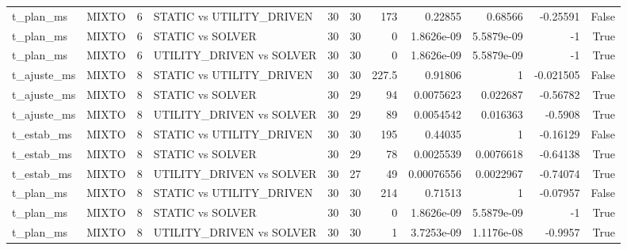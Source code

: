 \begin{tabular}{llrlrrrrrrr}
t_plan_ms & MIXTO & 6 & STATIC vs UTILITY_DRIVEN & 30 & 30 & 173 & 0.22855 & 0.68566 & -0.25591 & False \\
t_plan_ms & MIXTO & 6 & STATIC vs SOLVER & 30 & 30 & 0 & 1.8626e-09 & 5.5879e-09 & -1 & True \\
t_plan_ms & MIXTO & 6 & UTILITY_DRIVEN vs SOLVER & 30 & 30 & 0 & 1.8626e-09 & 5.5879e-09 & -1 & True \\
t_ajuste_ms & MIXTO & 8 & STATIC vs UTILITY_DRIVEN & 30 & 30 & 227.5 & 0.91806 & 1 & -0.021505 & False \\
t_ajuste_ms & MIXTO & 8 & STATIC vs SOLVER & 30 & 29 & 94 & 0.0075623 & 0.022687 & -0.56782 & True \\
t_ajuste_ms & MIXTO & 8 & UTILITY_DRIVEN vs SOLVER & 30 & 29 & 89 & 0.0054542 & 0.016363 & -0.5908 & True \\
t_estab_ms & MIXTO & 8 & STATIC vs UTILITY_DRIVEN & 30 & 30 & 195 & 0.44035 & 1 & -0.16129 & False \\
t_estab_ms & MIXTO & 8 & STATIC vs SOLVER & 30 & 29 & 78 & 0.0025539 & 0.0076618 & -0.64138 & True \\
t_estab_ms & MIXTO & 8 & UTILITY_DRIVEN vs SOLVER & 30 & 27 & 49 & 0.00076556 & 0.0022967 & -0.74074 & True \\
t_plan_ms & MIXTO & 8 & STATIC vs UTILITY_DRIVEN & 30 & 30 & 214 & 0.71513 & 1 & -0.07957 & False \\
t_plan_ms & MIXTO & 8 & STATIC vs SOLVER & 30 & 30 & 0 & 1.8626e-09 & 5.5879e-09 & -1 & True \\
t_plan_ms & MIXTO & 8 & UTILITY_DRIVEN vs SOLVER & 30 & 30 & 1 & 3.7253e-09 & 1.1176e-08 & -0.9957 & True \\
\bottomrule
\end{tabular}
